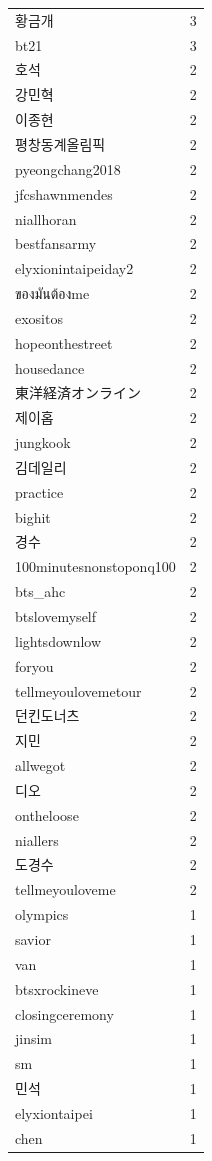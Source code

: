 \begin{tabular}{lr}
황금개 & 3 \\
bt21 & 3 \\
호석 & 2 \\
강민혁 & 2 \\
이종현 & 2 \\
평창동계올림픽 & 2 \\
pyeongchang2018 & 2 \\
jfcshawnmendes & 2 \\
niallhoran & 2 \\
bestfansarmy & 2 \\
elyxionintaipeiday2 & 2 \\
ของมันต้องme & 2 \\
exositos & 2 \\
hopeonthestreet & 2 \\
housedance & 2 \\
東洋経済オンライン & 2 \\
제이홉 & 2 \\
jungkook & 2 \\
김데일리 & 2 \\
practice & 2 \\
bighit & 2 \\
경수 & 2 \\
100minutesnonstoponq100 & 2 \\
bts\_ahc & 2 \\
btslovemyself & 2 \\
lightsdownlow & 2 \\
foryou & 2 \\
tellmeyoulovemetour & 2 \\
던킨도너츠 & 2 \\
지민 & 2 \\
allwegot & 2 \\
디오 & 2 \\
ontheloose & 2 \\
niallers & 2 \\
도경수 & 2 \\
tellmeyouloveme & 2 \\
olympics & 1 \\
savior & 1 \\
van & 1 \\
btsxrockineve & 1 \\
closingceremony & 1 \\
jinsim & 1 \\
sm & 1 \\
민석 & 1 \\
elyxiontaipei & 1 \\
chen & 1 \\

\end{tabular}
